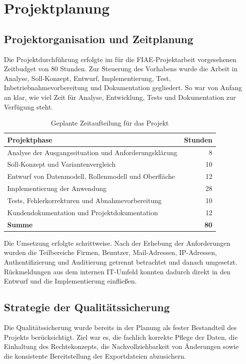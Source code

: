 \section{Projektplanung}
\label{sec:Projektplanung}
\subsection{Projektorganisation und Zeitplanung}
\label{sec:Projektorganisation}
Die Projektdurchführung erfolgte im für die FIAE-Projektarbeit vorgesehenen
Zeitbudget von 80 Stunden. Zur Steuerung des Vorhabens wurde die Arbeit in
Analyse, Soll-Konzept, Entwurf, Implementierung, Test, Inbetriebnahmevorbereitung
und Dokumentation gegliedert. So war von Anfang an klar, wie viel Zeit für
Analyse, Entwicklung, Tests und Dokumentation zur Verfügung steht.

\begin{table}[htbp]
\centering
\begin{tabular}{|p{9cm}|r|}
\hline
\textbf{Projektphase} & \textbf{Stunden} \\
\hline
Analyse der Ausgangssituation und Anforderungsklärung & 8 \\
\hline
Soll-Konzept und Variantenvergleich & 10 \\
\hline
Entwurf von Datenmodell, Rollenmodell und Oberfläche & 12 \\
\hline
Implementierung der Anwendung & 28 \\
\hline
Tests, Fehlerkorrekturen und Abnahmevorbereitung & 10 \\
\hline
Kundendokumentation und Projektdokumentation & 12 \\
\hline
\textbf{Summe} & \textbf{80} \\
\hline
\end{tabular}
\caption{Geplante Zeitaufteilung für das Projekt}
\label{tab:Zeitplanung}
\end{table}

Die Umsetzung erfolgte schrittweise. Nach der Erhebung der Anforderungen
wurden die Teilbereiche Firmen, Benutzer, Mail-Adressen, IP-Adressen,
Authentifizierung und Auditierung getrennt betrachtet und danach umgesetzt.
Rückmeldungen aus dem internen IT-Umfeld konnten dadurch direkt in den Entwurf
und die Implementierung einfließen.

\subsection{Strategie der Qualitätssicherung}
\label{sec:QSStrategie}
Die Qualitätssicherung wurde bereits in der Planung als fester Bestandteil des
Projekts berücksichtigt. Ziel war es, die fachlich korrekte Pflege der Daten,
die Einhaltung des Rechtekonzepts, die Nachvollziehbarkeit von Änderungen sowie
die konsistente Bereitstellung der Exportdateien abzusichern.

